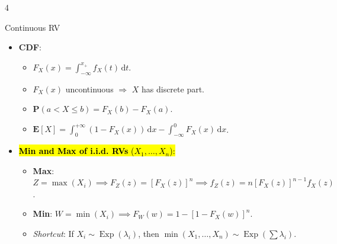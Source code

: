 \documentclass[landscape,a4paper]{article}
\renewcommand{\emph}[1]{\hl{#1}}
\newcommand{\PP}{\mathbf{P}}
\newcommand{\EE}{\mathbf{E}}
\newcommand{\var}{\operatorname{var}}
\begin{document}
\begin{multicols*}{4}
\begin{card}{Continuous RV}
\begin{itemize}
\begin{itemize}
\begin{itemize}
						\item $\EE[X^2]=\mu^2+\sigma^2$,
						\item $\EE[X^4]=3\sigma^4+6\sigma^2\mu^2+\mu^4$,
						\item $\var[X]=\sigma^2$.
						\item $Y=\alpha X+\beta\sim N(\alpha\mu+\beta,\alpha^2\sigma^2)$.
					\end{itemize}
				\end{itemize}
				\item \textbf{CDF}:\begin{itemize}
					\item $F_X(x)=\int_{-\infty}^{x_+} f_X(t)\,\mathrm dt$.
					\item $F_X(x)$ uncontinuous $\Rightarrow$ $X$ has discrete part.
					\item $\PP(a<X\le b)=F_X(b)-F_X(a)$.
					\item $\EE[X]=\int_0^{+\infty}(1-F_X(x))\,\mathrm dx-\int_{-\infty}^0F_X(x)\,\mathrm dx$.
				\end{itemize}
				
				\item \emph{\textbf{Min and Max of i.i.d. RVs} ($X_1, \dots, X_n$):}
				\begin{itemize}
					\item \textbf{Max}: $Z = \max(X_i) \implies F_Z(z) = [F_X(z)]^n \implies f_Z(z) = n[F_X(z)]^{n-1} f_X(z)$.
					\item \textbf{Min}: $W = \min(X_i) \implies F_W(w) = 1 - [1 - F_X(w)]^n$.
					\item \textit{Shortcut}: If $X_i \sim \operatorname{Exp}(\lambda_i)$, then $\min(X_1, \dots, X_n) \sim \operatorname{Exp}(\sum \lambda_i)$.
				\end{itemize}
				

\end{itemize}
\end{card}
\end{multicols*}
\end{document}
